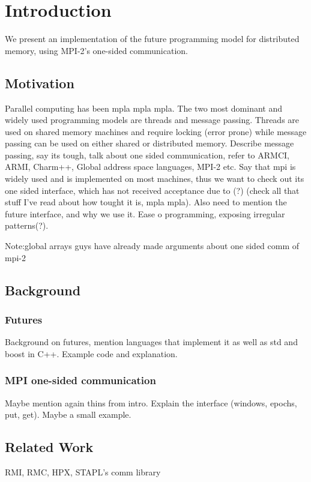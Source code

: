 \chapter{Introduction}
We present an implementation of the future programming model for distributed memory,
using MPI-2's one-sided communication.


\section{Motivation}
Parallel computing has been mpla mpla mpla.
The two most dominant and widely used programming models are threads and message passing.
Threads are used on shared memory machines and require locking (error prone) while message
passing can be used on either shared or distributed memory. Describe message passing, say
its tough, talk about one sided communication, refer to ARMCI, ARMI, Charm++, Global address
space languages, MPI-2 etc.  Say that mpi is widely used and is implemented on most machines,
thus we want to check out its one sided interface, which has not received acceptance due to (?)
(check all that stuff I've read about how tought it is, mpla mpla).  Also need to mention the
future interface, and why we use it. Ease o programming, exposing irregular patterns(?).

Note:global arrays guys have already made arguments about one sided comm of mpi-2 

\section{Background}
\label{sect:futures}
\subsection{Futures}
Background on futures, mention languages that implement it as well as std and boost in C++.
Example code and explanation.

\label{sect:mpi-one-sided}
\subsection{MPI one-sided communication}
Maybe mention again thins from intro.  Explain the interface (windows, epochs, put, get).
Maybe a small example.

\section{Related Work}
RMI, RMC, HPX, STAPL's comm library

